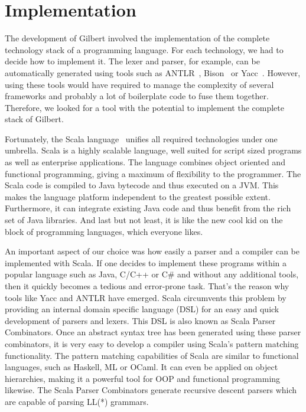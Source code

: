 \chapter{Implementation}
\label{cha:implementation}


The development of Gilbert involved the implementation of the complete technology stack of a programming language.
For each technology, we had to decide how to implement it.
The lexer and parser, for example, can be automatically generated using tools such as ANTLR~\cite{antlr}, Bison~\cite{bison} or Yacc~\cite{yacc}.
However, using these tools would have required to manage the complexity of several frameworks and probably a lot of boilerplate code to fuse them together.
Therefore, we looked for a tool with the potential to implement the complete stack of Gilbert.

Fortunately, the Scala language~\cite{scala,odersky:2010a} unifies all required technologies under one umbrella.
Scala is a highly scalable language, well suited for script sized programs as well as enterprise applications.
The language combines object oriented and functional programming, giving a maximum of flexibility to the programmer.
The Scala code is compiled to Java bytecode and thus executed on a JVM.
This makes the language platform independent to the greatest possible extent.
Furthermore, it can integrate existing Java code and thus benefit from the rich set of Java libraries.
And last but not least, it is like the new cool kid on the block of programming languages, which everyone likes.

An important aspect of our choice was how easily a parser and a compiler can be implemented with Scala.
If one decides to implement these programs within a popular language such as Java, C/C++ or C\# and without any additional tools, then it quickly becomes a tedious and error-prone task.
That's the reason why tools like Yacc and ANTLR have emerged.
Scala circumvents this problem by providing an internal domain specific language (DSL) for an easy and quick development of parsers and lexers.
This DSL is also known as Scala Parser Combinators.
Once an abstract syntax tree has been generated using these parser combinators, it is very easy to develop a compiler using Scala's pattern matching functionality.
The pattern matching capabilities of Scala are similar to functional languages, such as Haskell, ML or OCaml.
It can even be applied on object hierarchies, making it a powerful tool for OOP and functional programming likewise.
The Scala Parser Combinators generate recursive descent parsers which are capable of parsing LL(*) grammars.


